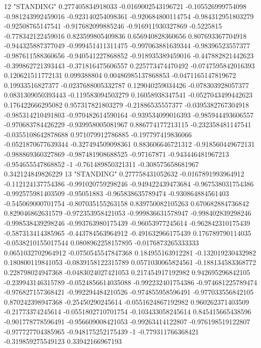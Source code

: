 12 "STANDING" 0.277405834918033 -0.0169002543196721 -0.105526999754098 -0.981243992459016 -0.923140254098361 -0.920684800114754 -0.984312951803279 -0.92508765147541 -0.917682099885246 -0.916911930327869 -0.5225815 -0.778342122459016 0.823599805409836 0.656940828360656 0.807693367704918 -0.944325887377049 -0.999451411311475 -0.997063881639344 -0.98396523557377 -0.987611588360656 -0.940541227868852 -0.918935389459016 -0.447882821442623 -0.399862721393443 -0.371816475606557 0.225773474470492 -0.0747595842016393 0.120621511772131 0.099388804 0.00486985137868853 -0.0471165147819672 0.19933516827377 -0.0237688005332787 0.129040259034426 -0.078303928057377 0.0831309050393443 -0.119583094503279 0.16058938347541 -0.0527043499442623 0.176422666295082 0.957317821803279 -0.21886535557377 -0.0395382767304918 -0.985314210491803 -0.970482614590164 -0.939534099016393 -0.985944493606557 -0.970683784426229 -0.939958005081967 0.886774177213115 -0.232358481147541 -0.0355108642878688 0.971079912786885 -0.197797419836066 -0.0521870677639344 -0.327494509098361 0.883606646721312 -0.918560449672131 -0.988869360327869 -0.987481908688525 -0.97167871 -0.943446481967213 -0.954655547868852 -1 -0.761489850321311 -0.308575658681967 0.342124849826229
13 "STANDING" 0.277758431052632 -0.0167891993964912 -0.112124137754386 -0.991020759298246 -0.949422439473684 -0.967538031754386 -0.992575981403509 -0.95051883 -0.965838635789474 -0.930864884561403 -0.545069000701754 -0.807035155263158 0.839750082105263 0.670682884736842 0.829046862631579 -0.972353958421053 -0.999836631578947 -0.998402839298246 -0.998538439298246 -0.993763980175439 -0.96053977245614 -0.962842310175439 -0.587313414385965 -0.443784563964912 -0.491632966175439 0.176789790114035 -0.0538210155017544 0.0808962258157895 -0.0176873265333333 0.0651032702964912 -0.0750545547847368 0.184955163912281 -0.132019230432982 0.180800119841053 -0.0839158122315789 0.0571030065824561 -0.188134583368772 0.228798024947368 -0.0483024027421053 0.217454917192982 0.942695296842105 -0.239943146315789 -0.0524856614035088 -0.992232401754386 -0.974681225789474 -0.976827157368421 -0.992294484210526 -0.974855958596491 -0.977033556842105 0.870242398947368 -0.25450290245614 -0.0551624867192982 0.960262371403509 -0.21773374245614 -0.0551802710701754 -0.103433058245614 0.845415665438596 -0.901778778596491 -0.956609008421053 -0.99263414122807 -0.976198519122807 -0.977727704385965 -0.948175252175439 -1 -0.779311766368421 -0.319859275549123 0.33942166967193
